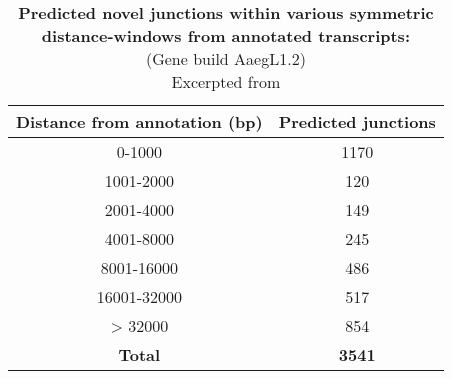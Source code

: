 \begin{table}[hp]
 \begin{center} \sf
\begin{tabular}{cc}\toprule
\textbf{Distance from annotation (bp)} & \textbf{Predicted junctions}\\ \midrule
0-1000 & 1170\\
1001-2000 & 120\\
2001-4000 & 149\\
4001-8000 & 245\\
8001-16000 & 486\\
16001-32000 & 517\\
> 32000 & 854\\ \midrule
\textbf{Total} & \textbf{3541}\\ \bottomrule
 \end{tabular}
 \end{center}

\caption[Predicted novel junctions within various symmetric distance-windows from annotated transcripts]{\sf \textbf{Predicted novel junctions within various symmetric distance-windows from annotated transcripts:} \\
(Gene build AaegL1.2)\\
Excerpted from \cite{Bonizzoni2011}}

\label{tab:bonizzoni2011-novel-junx}
\end{table} 